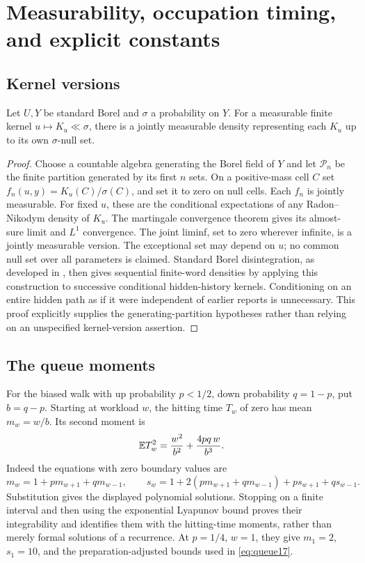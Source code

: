 \section{Measurability, occupation timing, and explicit constants}\label{sec:details}
\subsection{Kernel versions}
\begin{lemma}\label{lem:rn}
Let $U,Y$ be standard Borel and $\sigma$ a probability on $Y$. For a measurable finite kernel $u\mapsto K_u\ll\sigma$, there is a jointly measurable density representing each $K_u$ up to its own $\sigma$-null set.
\end{lemma}
\begin{proof}
Choose a countable algebra generating the Borel field of $Y$ and let $\mathcal P_n$ be the finite partition generated by its first $n$ sets. On a positive-mass cell $C$ set $f_n(u,y)=K_u(C)/\sigma(C)$, and set it to zero on null cells. Each $f_n$ is jointly measurable. For fixed $u$, these are the conditional expectations of any Radon--Nikodym density of $K_u$. The martingale convergence theorem gives its almost-sure limit and $L^1$ convergence. The joint liminf, set to zero wherever infinite, is a jointly measurable version. The exceptional set may depend on $u$; no common null set over all parameters is claimed. Standard Borel disintegration, as developed in \cite{Kallenberg,BertsekasShreve}, then gives sequential finite-word densities by applying this construction to successive conditional hidden-history kernels. Conditioning on an entire hidden path as if it were independent of earlier reports is unnecessary. This proof explicitly supplies the generating-partition hypotheses rather than relying on an unspecified kernel-version assertion.
\end{proof}

\subsection{The queue moments}
For the biased walk with up probability $p<1/2$, down probability $q=1-p$, put $b=q-p$. Starting at workload $w$, the hitting time $T_w$ of zero has mean $m_w=w/b$. Its second moment is
\begin{equation}\label{eq:queuemom}
 \mathbb E T_w^2={w^2\over b^2}+{4pq\,w\over b^3}.
\end{equation}
Indeed the equations with zero boundary values are
\[
 m_w=1+pm_{w+1}+qm_{w-1},\qquad
 s_w=1+2(pm_{w+1}+qm_{w-1})+ps_{w+1}+qs_{w-1}.
\]
Substitution gives the displayed polynomial solutions. Stopping on a finite interval and then using the exponential Lyapunov bound proves their integrability and identifies them with the hitting-time moments, rather than merely formal solutions of a recurrence. At $p=1/4$, $w=1$, they give $m_1=2$, $s_1=10$, and the preparation-adjusted bounds used in \eqref{eq:queue17}.


